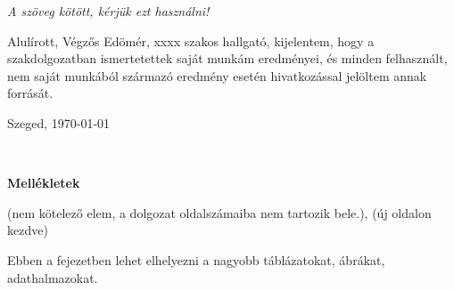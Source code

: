 \documentclass[a4paper,12pt]{report}
\theoremstyle{definition}
\theoremstyle{remark}
\begin{document}
{\it A szöveg kötött, kérjük ezt használni!}

Alulírott, Végzős Edömér, xxxx szakos hallgató, kijelentem, hogy a szakdolgozatban ismertetettek saját munkám eredményei, és minden felhasznált, nem saját munkából származó eredmény esetén hivatkozással jelöltem annak forrását. 


\begin{flushleft}
\vspace*{1cm}
Szeged, \today
\end{flushleft}

\begin{flushright}
 \vspace*{1cm}
 \makebox[7cm]{\rule{6cm}{.4pt}}\\
\end{flushright}

\pagebreak

\newpage
{\Huge \bf Mellékletek}


\vspace{2 cm}

(nem kötelező elem, a dolgozat oldalszámaiba nem tartozik bele.), (új oldalon kezdve)

Ebben a fejezetben lehet elhelyezni a nagyobb táblázatokat, ábrákat, adathalmazokat.
\end{document}
